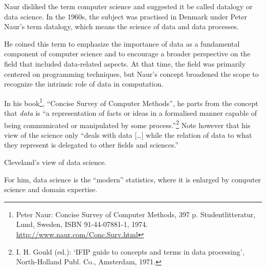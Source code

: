 Naur disliked the term computer science and suggested it be called datalogy or data
science.  In the 1960s, the subject was practised in Denmark under Peter
Naur's term datalogy, which means the science of data and data processes.

He coined this term to emphasize the importance of data as a fundamental component of
computer science and to encourage a broader perspective on the field that included
data-related aspects. At that time, the field was primarily centered on programming
techniques, but Naur's concept broadened the scope to recognize the intrinsic role of data
in computation.

In his book\footnote{Peter Naur: Concise Survey of Computer Methods, 397 p.
Studentlitteratur, Lund, Sweden, ISBN 91-44-07881-1, 1974.
\url{http://www.naur.com/Conc.Surv.html}}, ``Concise Survey of Computer Methods'', he
parts from the concept that \emph{data} is ``a representation of facts or ideas in a
formalised manner capable of being communicated or manipulated by some
process.''\footnote{I. H. Gould (ed.): ‘IFIP guide to concepts and terms in data
processing’, North-Holland Publ. Co., Amsterdam, 1971.} Note however that his view of the
science only ``deals with data [\dots] while the relation of data to what they represent
is delegated to other fields and sciences.''

\def\clevelandds{(0,0) circle (20mm)}
\def\clevelandst{(0:-5mm) circle (15mm)}
\def\clevelandde {(2,1) circle (15mm)}
\def\clevelandcs {(2,-1) circle (15mm)}

\begin{figurebox}[label=fig:cleveland]{Cleveland's view of data science.}
  \centering
  \tcblower
    For him, data science is the ``modern'' statistics,
    where it is enlarged by computer science and domain expertise.
  \label{fig:cleveland}
\end{figurebox}

